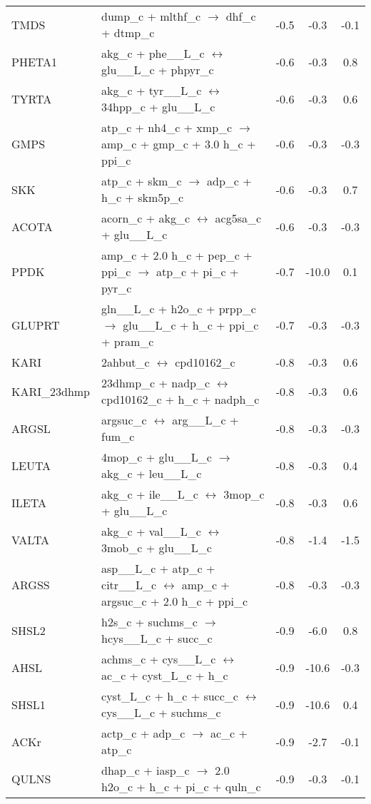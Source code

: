 \begin{supertabular}{lp{0.5\textwidth}ccc}
TMDS	&	dump\_c + mlthf\_c $\rightarrow$ dhf\_c + dtmp\_c	&	-0.5	&	-0.3	&	-0.1	\\
PHETA1	&	akg\_c + phe\_\_L\_c $\leftrightarrow$ glu\_\_L\_c + phpyr\_c	&	-0.6	&	-0.3	&	0.8	\\
TYRTA	&	akg\_c + tyr\_\_L\_c $\leftrightarrow$ 34hpp\_c + glu\_\_L\_c	&	-0.6	&	-0.3	&	0.6	\\
GMPS	&	atp\_c + nh4\_c + xmp\_c $\rightarrow$ amp\_c + gmp\_c + 3.0 h\_c + ppi\_c	&	-0.6	&	-0.3	&	-0.3	\\
SKK	&	atp\_c + skm\_c $\rightarrow$ adp\_c + h\_c + skm5p\_c	&	-0.6	&	-0.3	&	0.7	\\
ACOTA	&	acorn\_c + akg\_c $\leftrightarrow$ acg5sa\_c + glu\_\_L\_c	&	-0.6	&	-0.3	&	-0.3	\\
PPDK	&	amp\_c + 2.0 h\_c + pep\_c + ppi\_c $\rightarrow$ atp\_c + pi\_c + pyr\_c	&	-0.7	&	-10.0	&	0.1	\\
GLUPRT	&	gln\_\_L\_c + h2o\_c + prpp\_c $\rightarrow$ glu\_\_L\_c + h\_c + ppi\_c + pram\_c	&	-0.7	&	-0.3	&	-0.3	\\
KARI	&	2ahbut\_c $\leftrightarrow$ cpd10162\_c	&	-0.8	&	-0.3	&	0.6	\\
KARI\_23dhmp	&	23dhmp\_c + nadp\_c $\leftrightarrow$ cpd10162\_c + h\_c + nadph\_c	&	-0.8	&	-0.3	&	0.6	\\
ARGSL	&	argsuc\_c $\leftrightarrow$ arg\_\_L\_c + fum\_c	&	-0.8	&	-0.3	&	-0.3	\\
LEUTA	&	4mop\_c + glu\_\_L\_c $\rightarrow$ akg\_c + leu\_\_L\_c	&	-0.8	&	-0.3	&	0.4	\\
ILETA	&	akg\_c + ile\_\_L\_c $\leftrightarrow$ 3mop\_c + glu\_\_L\_c	&	-0.8	&	-0.3	&	0.6	\\
VALTA	&	akg\_c + val\_\_L\_c $\leftrightarrow$ 3mob\_c + glu\_\_L\_c	&	-0.8	&	-1.4	&	-1.5	\\
ARGSS	&	asp\_\_L\_c + atp\_c + citr\_\_L\_c $\leftrightarrow$ amp\_c + argsuc\_c + 2.0 h\_c + ppi\_c	&	-0.8	&	-0.3	&	-0.3	\\
SHSL2	&	h2s\_c + suchms\_c $\rightarrow$ hcys\_\_L\_c + succ\_c	&	-0.9	&	-6.0	&	0.8	\\
AHSL	&	achms\_c + cys\_\_L\_c $\leftrightarrow$ ac\_c + cyst\_L\_c + h\_c	&	-0.9	&	-10.6	&	-0.3	\\
SHSL1	&	cyst\_L\_c + h\_c + succ\_c $\leftrightarrow$ cys\_\_L\_c + suchms\_c	&	-0.9	&	-10.6	&	0.4	\\
ACKr	&	actp\_c + adp\_c $\rightarrow$ ac\_c + atp\_c	&	-0.9	&	-2.7	&	-0.1	\\
QULNS	&	dhap\_c + iasp\_c $\rightarrow$ 2.0 h2o\_c + h\_c + pi\_c + quln\_c	&	-0.9	&	-0.3	&	-0.1	\\

\end{supertabular}
